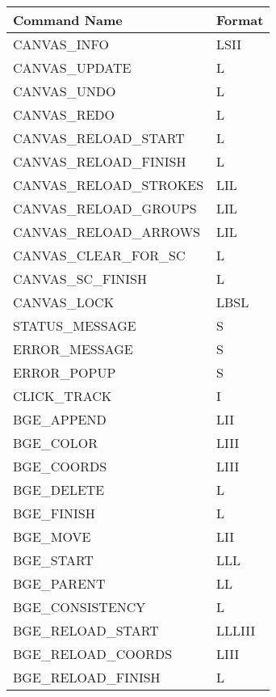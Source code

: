\begin{table}[h]
  \begin{tabular}{ | l | l | }
  \hline
  \textbf{Command Name} & \textbf{Format} \\ 
  \hline
  CANVAS\_INFO & LSII \\
  \hline
  CANVAS\_UPDATE & L \\
  \hline
  CANVAS\_UNDO & L \\
  \hline
  CANVAS\_REDO & L \\
  \hline
  CANVAS\_RELOAD\_START & L \\
  \hline
  CANVAS\_RELOAD\_FINISH & L \\
  \hline
  CANVAS\_RELOAD\_STROKES & LIL \\
  \hline
  CANVAS\_RELOAD\_GROUPS & LIL \\
  \hline
  CANVAS\_RELOAD\_ARROWS & LIL \\
  \hline
  CANVAS\_CLEAR\_FOR\_SC & L \\
  \hline
  CANVAS\_SC\_FINISH & L \\
  \hline
  CANVAS\_LOCK & LBSL \\
  \hline
  STATUS\_MESSAGE & S \\
  \hline
  ERROR\_MESSAGE & S \\
  \hline
  ERROR\_POPUP & S \\
  \hline
  CLICK\_TRACK & I \\
  \hline
  BGE\_APPEND & LII \\
  \hline
  BGE\_COLOR & LIII \\
  \hline
  BGE\_COORDS & LIII \\
  \hline
  BGE\_DELETE & L \\
  \hline
  BGE\_FINISH & L \\
  \hline
  BGE\_MOVE & LII \\
  \hline
  BGE\_START & LLL \\
  \hline
  BGE\_PARENT & LL \\
  \hline
  BGE\_CONSISTENCY & L \\
  \hline
  BGE\_RELOAD\_START & LLLIII \\
  \hline
  BGE\_RELOAD\_COORDS & LIII \\
  \hline
  BGE\_RELOAD\_FINISH & L \\
  \hline
  \end{tabular}
\end{table}

